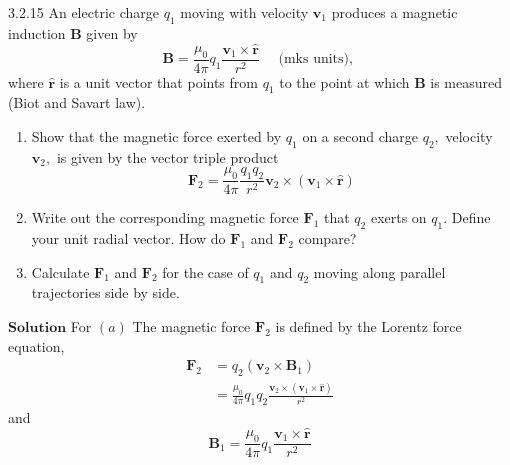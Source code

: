 \documentclass{styles/kaobook}
\begin{document}
\begin{greenbox}{3.2.15}
An electric charge $q_{1}$ moving with velocity $\mathbf{v}_{1}$ produces a magnetic induction $\mathbf{B}$
given by
$$
\mathbf{B}=\frac{\mu_{0}}{4 \pi} q_{1} \frac{\mathbf{v}_{1} \times \hat{\mathbf{r}}}{r^{2}} \quad \text { (mks units), }
$$
where $\hat{\mathbf{r}}$ is a unit vector that points from $q_{1}$ to the point at which $\mathbf{B}$ is measured (Biot and Savart law).

\begin{enumerate}[$(a)$]
\item Show that the magnetic force exerted by $q_{1}$ on a second charge $q_{2},$ velocity $\mathbf{v}_{2},$ is
given by the vector triple product
$$
\mathbf{F}_{2}=\frac{\mu_{0}}{4 \pi} \frac{q_{1} q_{2}}{r^{2}} \mathbf{v}_{2} \times\left(\mathbf{v}_{1} \times \hat{\mathbf{r}}\right)
$$
\item Write out the corresponding magnetic force $\mathbf{F}_{1}$ that $q_{2}$ exerts on $q_{1} .$ Define your
unit radial vector. How do $\mathbf{F}_{1}$ and $\mathbf{F}_{2}$ compare?
\item Calculate $\mathbf{F}_{1}$ and $\mathbf{F}_{2}$ for the case of $q_{1}$ and $q_{2}$ moving along parallel trajectories side by side.
\end{enumerate}
\end{greenbox}



$\boxed{\textbf{Solution}}$ For $(a)$ The magnetic force $\mathbf{F}_{2}$ is defined by the Lorentz force equation,
$$
\begin{aligned}
\mathbf{F}_{2} &=q_{2}\left(\mathbf{v}_{2} \times \mathbf{B}_{1}\right) \\
&=\frac{\mu_{0}}{4 \pi} q_{1} q_{2} \frac{\mathbf{v}_{2} \times\left(\mathbf{v}_{1} \times \hat{\mathbf{r}}\right)}{r^{2}}
\end{aligned}
$$
and 
$$
\mathbf{B}_{1}=\frac{\mu_{0}}{4 \pi} q_{1} \frac{\mathbf{v}_{1} \times \hat{\mathbf{r}}}{r^{2}}
$$
\end{document}
